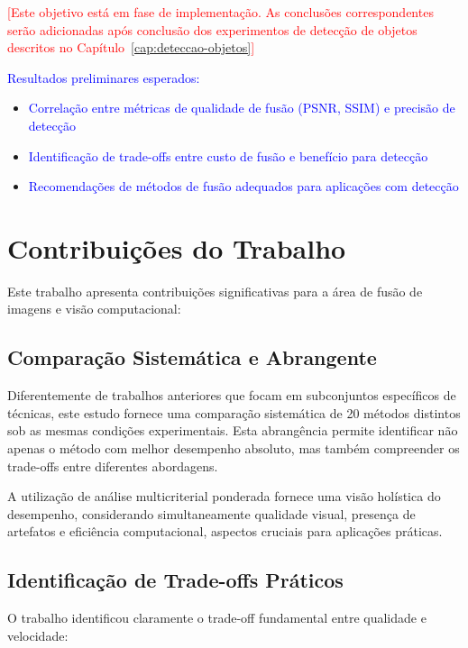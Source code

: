 \textcolor{red}{[Este objetivo está em fase de implementação. As conclusões correspondentes serão adicionadas após conclusão dos experimentos de detecção de objetos descritos no Capítulo~\ref{cap:deteccao-objetos}]}

\textcolor{blue}{Resultados preliminares esperados:}
\begin{itemize}
    \item \textcolor{blue}{Correlação entre métricas de qualidade de fusão (PSNR, SSIM) e precisão de detecção}
    \item \textcolor{blue}{Identificação de trade-offs entre custo de fusão e benefício para detecção}
    \item \textcolor{blue}{Recomendações de métodos de fusão adequados para aplicações com detecção}
\end{itemize}

\section{Contribuições do Trabalho}

Este trabalho apresenta contribuições significativas para a área de fusão de imagens e visão computacional:

\subsection{Comparação Sistemática e Abrangente}

Diferentemente de trabalhos anteriores que focam em subconjuntos específicos de técnicas, este estudo fornece uma comparação sistemática de 20 métodos distintos sob as mesmas condições experimentais. Esta abrangência permite identificar não apenas o método com melhor desempenho absoluto, mas também compreender os trade-offs entre diferentes abordagens.

A utilização de análise multicriterial ponderada fornece uma visão holística do desempenho, considerando simultaneamente qualidade visual, presença de artefatos e eficiência computacional, aspectos cruciais para aplicações práticas.

\subsection{Identificação de Trade-offs Práticos}

O trabalho identificou claramente o trade-off fundamental entre qualidade e velocidade:

